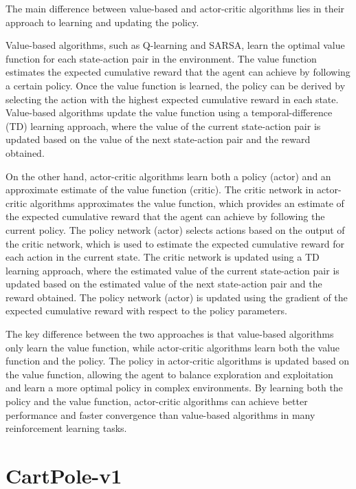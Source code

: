 \documentclass{article} %
\begin{document}
The main difference between value-based and actor-critic algorithms lies in their approach to learning and updating the policy.

Value-based algorithms, such as Q-learning and SARSA, learn the optimal value function for each state-action pair in the environment. The value function estimates the expected cumulative reward that the agent can achieve by following a certain policy. Once the value function is learned, the policy can be derived by selecting the action with the highest expected cumulative reward in each state. Value-based algorithms update the value function using a temporal-difference (TD) learning approach, where the value of the current state-action pair is updated based on the value of the next state-action pair and the reward obtained.

On the other hand, actor-critic algorithms learn both a policy (actor) and an approximate estimate of the value function (critic). The critic network in actor-critic algorithms approximates the value function, which provides an estimate of the expected cumulative reward that the agent can achieve by following the current policy. The policy network (actor) selects actions based on the output of the critic network, which is used to estimate the expected cumulative reward for each action in the current state. The critic network is updated using a TD learning approach, where the estimated value of the current state-action pair is updated based on the estimated value of the next state-action pair and the reward obtained. The policy network (actor) is updated using the gradient of the expected cumulative reward with respect to the policy parameters.

The key difference between the two approaches is that value-based algorithms only learn the value function, while actor-critic algorithms learn both the value function and the policy. The policy in actor-critic algorithms is updated based on the value function, allowing the agent to balance exploration and exploitation and learn a more optimal policy in complex environments. By learning both the policy and the value function, actor-critic algorithms can achieve better performance and faster convergence than value-based algorithms in many reinforcement learning tasks.

\section{CartPole-v1}
\label{sec:cart-definition}
\end{document}
